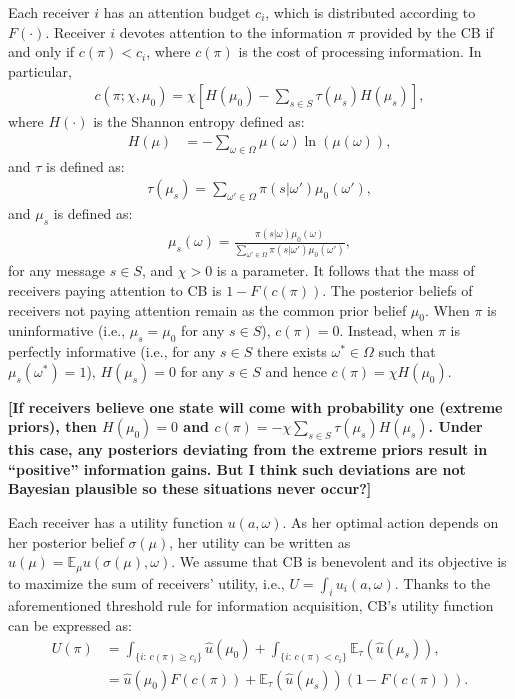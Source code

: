 \documentclass[12pt,a4paper]{article}
\begin{document}
Each receiver $i$ has an attention budget $c_i$, which is distributed according to $F(\cdot)$. Receiver $i$ devotes attention to the information $\pi$ provided by the CB if and only if $c(\pi)<c_i$, where $c(\pi)$ is the cost of processing information. In particular,
\begin{align}
    c(\pi; \chi, \mu_0) = \chi\left[H(\mu_0)-\sum_{s \in S}\tau(\mu_s) H(\mu_s)\right],
\end{align}
where $H(\cdot)$ is the Shannon entropy defined as:
\begin{align}
    H(\mu) & = -\sum_{\omega\in\Omega}\mu(\omega)\ln(\mu(\omega)),
\end{align}
and $\tau$ is defined as:
\begin{align}
    \tau(\mu_s) = \sum_{\omega'\in\Omega}\pi(s|\omega')\mu_0(\omega'),
\end{align}
and $\mu_s$ is defined as:
\begin{align}
    \mu_s(\omega) = \frac{\pi(s|\omega)\mu_0(\omega)}{\sum_{\omega'\in\Omega}\pi(s|\omega')\mu_0(\omega')},
\end{align}
for any message $s\in S$, and $\chi>0$ is a parameter. It follows that the mass of receivers paying attention to CB is $1-F(c(\pi))$. The posterior beliefs of receivers not paying attention remain as the common prior belief $\mu_0$. When $\pi$ is uninformative (i.e., $\mu_s = \mu_0$ for any $s\in S$), $c(\pi)=0$. Instead, when $\pi$ is perfectly informative (i.e., for any $s \in S$ there exists $\omega^* \in \Omega$ such that $\mu_s(\omega^*)=1$), $H(\mu_s)=0$ for any $s\in S$ and hence $c(\pi)=\chi H(\mu_0)$.

\textbf{[If receivers believe one state will come with probability one (extreme priors), then $H(\mu_0)=0$ and $c(\pi)=-\chi\sum_{s \in S}\tau(\mu_s)H(\mu_s)$. Under this case, any posteriors deviating from the extreme priors result in ``positive'' information gains. But I think such deviations are not Bayesian plausible so these situations never occur?]}

Each receiver has a utility function $u(a,\omega)$. As her optimal action depends on her posterior belief $\sigma(\mu)$, her utility can be written as $\hat{u}(\mu)=\mathbb{E}_\mu u(\sigma(\mu),\omega)$. We assume that CB is benevolent and its objective is to maximize the sum of receivers' utility, i.e., $U = \int_i u_i(a,\omega)$. Thanks to the aforementioned threshold rule for information acquisition, CB's utility function can be expressed as:
\begin{align}
   U(\pi) & = \int_{\{i:\, c(\pi) \geq c_i\}} \hat{u}(\mu_0) + \int_{\{i:\, c(\pi) < c_i\}} \mathbb{E}_\tau(\hat{u}(\mu_s)), \\
   & = \hat{u}(\mu_0)F(c(\pi)) + \mathbb{E}_\tau(\hat{u}(\mu_s))(1-F(c(\pi))).
\end{align}
\end{document}
